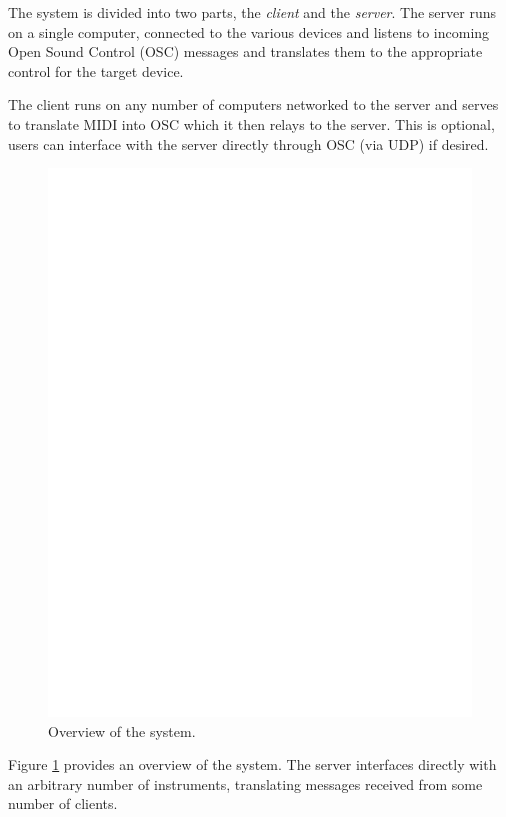 \documentclass[../main.tex]{subfiles}
\begin{document}
The system is divided into two parts, the {\em client} and the {\em server}. The server runs on a single computer, connected to the various devices and listens to incoming Open Sound 
Control (OSC) messages and translates them to the appropriate control for the target device. 

The client runs on any number of computers networked to the server and serves to translate MIDI into OSC which it then relays to the server. This is optional, users
can interface with the server directly through OSC (via UDP) if desired.

\begin{figure}[htp]
	\centering
	\includegraphics[page=2]{./img/Diagram-specific.pdf}
	\caption{Overview of the system.}
	\label{fig:overview}
\end{figure}

Figure \ref{fig:overview} provides an overview of the system. The server interfaces directly with an arbitrary number of instruments, translating messages received from
some number of clients.
\end{document}
